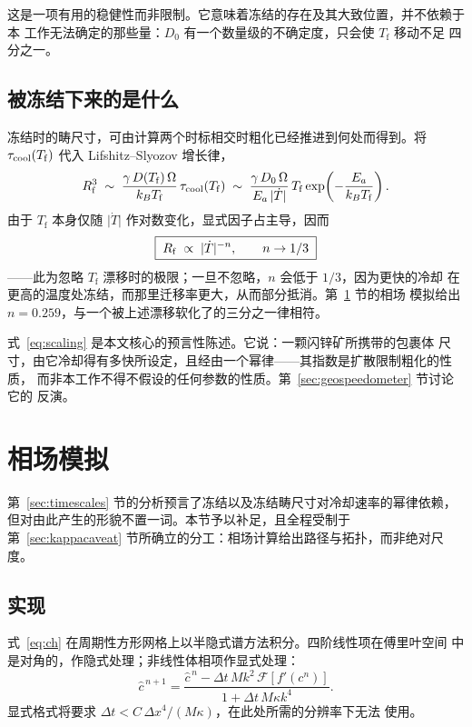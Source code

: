 \documentclass[11pt,a4paper]{ctexart}
\newcommand{\Tf}{T_{\mathrm{f}}}
\begin{document}
这是一项有用的稳健性而非限制。它意味着冻结的存在及其大致位置，并不依赖于本
工作无法确定的那些量：$D_0$ 有一个数量级的不确定度，只会使 $\Tf$ 移动不足
四分之一。

\subsection{被冻结下来的是什么}

冻结时的畴尺寸，可由计算两个时标相交时粗化已经推进到何处而得到。将
$\tau_{\rm cool}(\Tf)$ 代入 Lifshitz--Slyozov 增长律，
\begin{equation}
R_{\rm f}^3 \;\sim\; \frac{\gamma\, D(\Tf)\, \Omega}{k_B \Tf}\,
                     \tau_{\rm cool}(\Tf)
             \;\sim\; \frac{\gamma\, D_0\, \Omega}{E_a\, \lvert\dot{T}\rvert}
                      \, \Tf \exp\!\left(-\frac{E_a}{k_B \Tf}\right).
\label{eq:Rf}
\end{equation}
由于 $\Tf$ 本身仅随 $\lvert\dot{T}\rvert$ 作对数变化，显式因子占主导，因而
\begin{equation}
\boxed{\;R_{\rm f} \;\propto\; \lvert\dot{T}\rvert^{-n}, \qquad n \to 1/3 \;}
\label{eq:scaling}
\end{equation}
——此为忽略 $\Tf$ 漂移时的极限；一旦不忽略，$n$ 会低于 $1/3$，因为更快的冷却
在更高的温度处冻结，而那里迁移率更大，从而部分抵消。第~\ref{sec:pf} 节的相场
模拟给出 $n = 0.259$，与一个被上述漂移软化了的三分之一律相符。

式~\eqref{eq:scaling} 是本文核心的预言性陈述。它说：一颗闪锌矿所携带的包裹体
尺寸，由它冷却得有多快所设定，且经由一个幂律——其指数是扩散限制粗化的性质，
而非本工作不得不假设的任何参数的性质。第~\ref{sec:geospeedometer} 节讨论它的
反演。

\section{相场模拟}
\label{sec:pf}

第~\ref{sec:timescales} 节的分析预言了冻结以及冻结畴尺寸对冷却速率的幂律依赖，
但对由此产生的形貌不置一词。本节予以补足，且全程受制于
第~\ref{sec:kappacaveat} 节所确立的分工：相场计算给出路径与拓扑，而非绝对尺度。

\subsection{实现}

式~\eqref{eq:ch} 在周期性方形网格上以半隐式谱方法积分。四阶线性项在傅里叶空间
中是对角的，作隐式处理；非线性体相项作显式处理：
\begin{equation}
\hat{c}^{\,n+1} = \frac{\hat{c}^{\,n} - \Delta t\, M k^2\,
                        \mathcal{F}\!\left[f'(c^n)\right]}
                       {1 + \Delta t\, M \kappa k^4}.
\label{eq:scheme}
\end{equation}
显式格式将要求 $\Delta t < C\,\Delta x^4/(M\kappa)$，在此处所需的分辨率下无法
使用。
\end{document}
